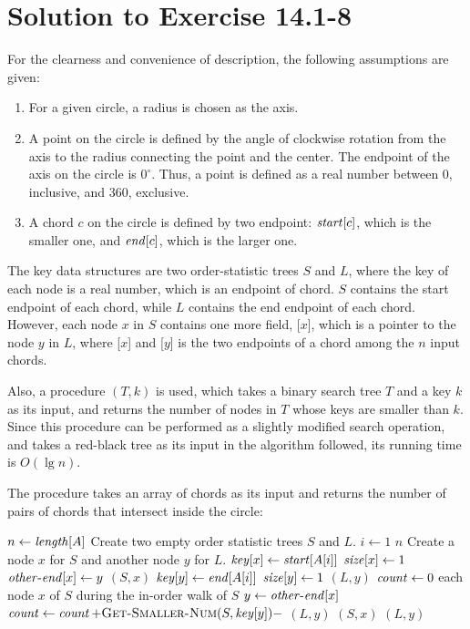 \documentclass[a4paper, fleqn]{article}
\begin{document}
\section*{Solution to Exercise 14.1-8}

For the clearness and convenience of description, the following
assumptions are given:
\begin{enumerate}
\item
For a given circle, a radius is chosen as the axis.

\item
A point on the circle is defined by the angle of clockwise rotation
from the axis to the radius connecting the point and the center. The
endpoint of the axis on the circle is $0^\circ$. Thus, a point is
defined as a real number between 0, inclusive, and 360, exclusive.

\item
A chord $c$ on the circle is defined by two endpoint: $\id{start}[c]$,
which is the smaller one, and $\id{end}[c]$, which is the larger one.
\end{enumerate}

The key data structures are two order-statistic trees $S$ and $L$,
where the key of each node is a real number, which is an endpoint of
chord. $S$ contains the start endpoint of each chord, while $L$
contains the end endpoint of each chord. However, each node $x$ in $S$
contains one more field, [$x$], which is a pointer to
the node $y$ in $L$, where [$x$] and [$y$] is the two
endpoints of a chord among the $n$ input chords.

Also, a procedure $(T,k)$ is used, which takes a
binary search tree $T$ and a key $k$ as its input, and returns the
number of nodes in $T$ whose keys are smaller than $k$. Since this
procedure can be performed as a slightly modified search operation,
and takes a red-black tree as its input in the algorithm followed, its
running time is $O(\lg n)$.

The procedure  takes an array of chords as its
input and returns the number of pairs of chords that intersect inside
the circle:

\begin{codebox}
\li $n \gets \id{length}[A]$
\li Create two empty order statistic trees $S$ and $L$.
\li \For $i \gets 1$ \To $n$
\li   \Do
        Create a node $x$ for $S$ and another node $y$ for $L$.
\li     $\id{key}[x] \gets \id{start}[A[i]]$
\li     $\id{size}[x] \gets 1$
\li     $\id{other-end}[x] \gets y$
\li     {}$(S,x)$
\li     $\id{key}[y] \gets \id{end}[A[i]]$
\li     $\id{size}[y] \gets 1$
\li     {}$(L,y)$
      \End
\li $\id{count} \gets 0$
\li \For each node $x$ of $S$ during the in-order walk of $S$
\li   \Do
        $y \gets \id{other-end}[x]$
\li     $\id{count} \gets \id{count} + 
          \proc{Get-Smaller-Num}(S, \id{key}[y]) - $
\zi         {}$(L,y)$
                          \label{li:inter-num-get-count}
\li     {}$(S,x)$
\li     {}$(L,y)$
      \End
\li \Return {}
\end{codebox}
\end{document}
